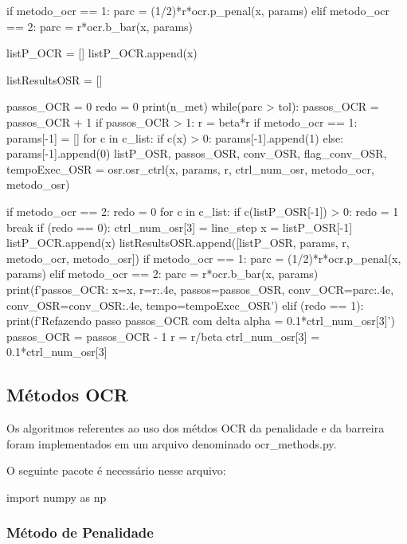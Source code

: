 \documentclass[10pt, a4paper]{article}
\begin{document}
\begin{python}
  if metodo_ocr == 1:
    parc = (1/2)*r*ocr.p_penal(x, params)
  elif metodo_ocr == 2:
    parc = r*ocr.b_bar(x, params)
    
  listP_OCR = []
  listP_OCR.append(x)

  listResultsOSR = []

  passos_OCR = 0
  redo = 0
  print(n_met)
  while(parc > tol):
    passos_OCR = passos_OCR + 1
    if passos_OCR > 1:
        r = beta*r
        if metodo_ocr == 1:
            params[-1] = []
            for c in c_list:
                if c(x) > 0:
                    params[-1].append(1)
                else:
                    params[-1].append(0)
    listP_OSR, passos_OSR, conv_OSR, flag_conv_OSR, tempoExec_OSR = osr.osr_ctrl(x, params, r, ctrl_num_osr, metodo_ocr, metodo_osr)
    
    if metodo_ocr == 2:
        redo = 0
        for c in c_list:
            if c(listP_OSR[-1]) > 0:
                redo = 1
                break
    if (redo == 0):
        ctrl_num_osr[3] = line_step
        x = listP_OSR[-1]
        listP_OCR.append(x)
        listResultsOSR.append([listP_OSR, params, r, metodo_ocr, metodo_osr])
        if metodo_ocr == 1:
            parc = (1/2)*r*ocr.p_penal(x, params)
        elif metodo_ocr == 2:
            parc = r*ocr.b_bar(x, params)
        print(f'{passos_OCR}: x={x}, r={r:.4e}, passos={passos_OSR}, conv_OCR={parc:.4e}, conv_OSR={conv_OSR:.4e}, tempo={tempoExec_OSR}')
    elif (redo == 1):
        print(f'Refazendo passo {passos_OCR} com delta alpha = {0.1*ctrl_num_osr[3]}')
        passos_OCR = passos_OCR - 1
        r = r/beta
        ctrl_num_osr[3] = 0.1*ctrl_num_osr[3]    
\end{python}

\subsection{Métodos OCR}

Os algoritmos referentes ao uso dos métdos OCR da penalidade e da barreira foram implementados em um arquivo denominado ocr\_methods.py.

\vspace{3mm}
O seguinte pacote é necessário nesse arquivo:

\begin{python}
  import numpy as np
\end{python}

\subsubsection{Método de Penalidade}
\end{document}
